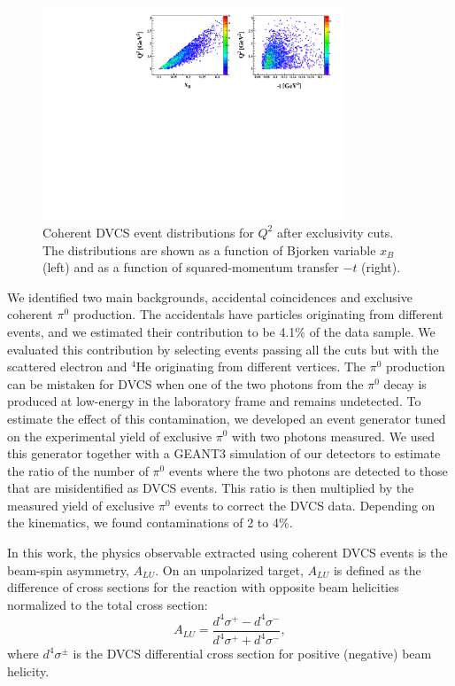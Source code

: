 \documentclass[twocolumn,nofootinbib,showpacs,prl,superscriptaddress,secnumarabic,amssymb,nobibnotes,aps,floatfix]{revtex4}
\begin{document}
\begin{figure}[tb]
\hspace{-0.45cm}
\includegraphics[width=9cm]{F_Q2_xB_t_Coh.pdf}
\caption{Coherent DVCS event distributions for $Q^2$ after exclusivity cuts. 
The distributions are shown as a function of Bjorken variable $x_B$ (left) 
and as a function of squared-momentum transfer $-t$ (right).}
\label{fig:kin-coverage}
\end{figure}

We identified two main backgrounds, accidental coincidences and exclusive coherent
$\pi^0$ production. The accidentals have particles originating from different events,
and we estimated their contribution to be 4.1\% of the data sample. We evaluated this 
contribution by selecting events passing all the cuts but with the scattered electron and 
$^4$He originating from different vertices. The $\pi^0$ production can
be mistaken for DVCS when one of the two photons from the $\pi^0$ 
decay is produced at low-energy in the laboratory frame and remains undetected.  
To estimate the effect of this contamination, we developed an event generator 
tuned on the experimental yield of exclusive $\pi^0$ with two photons measured. 
We used this generator together with a GEANT3 simulation of our 
detectors to estimate the ratio of the number of $\pi^0$ events where the 
two photons are detected to those that are misidentified as DVCS events. This 
ratio is then multiplied by the measured yield of exclusive $\pi^0$ events to 
correct the DVCS data. Depending on the kinematics, we found contaminations of 
2 to 4\%. 

In this work, the physics observable extracted using coherent DVCS events is
the beam-spin asymmetry, $A_{LU}$. On an unpolarized target, $A_{LU}$ is 
defined as the difference of cross sections for the reaction with opposite beam 
helicities normalized to the total cross section:
  \begin{equation}
  A_{LU} = \frac{d^{4}\sigma^{+} - d^{4}\sigma^{-} }
                {d^{4}\sigma^{+} + d^{4}\sigma^{-}},
    \label{BSA_equation}
  \end{equation}
where $d^{4}\sigma^{\pm}$ is the DVCS differential cross 
section for positive (negative) beam helicity. 
\end{document}
